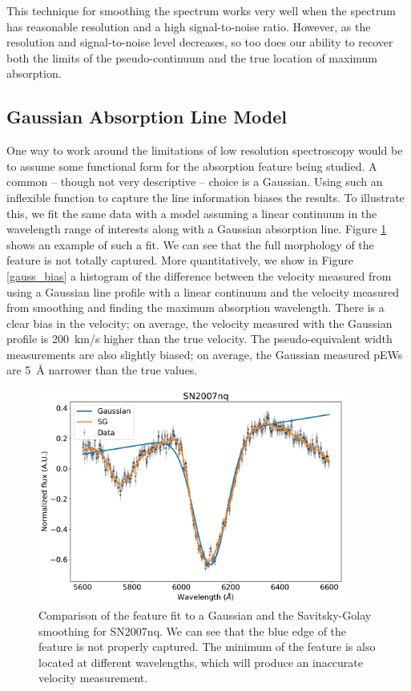 

This technique for smoothing the spectrum works very well when the spectrum has reasonable resolution and a high signal-to-noise ratio. However, as the resolution and signal-to-noise level decreases, so too does our ability to recover both the limits of the pseudo-continuum and the true location of maximum absorption. 

\subsection{Gaussian Absorption Line Model}
One way to work around the limitations of low resolution spectroscopy would be to assume some functional form for the absorption feature being studied. A common -- though not very descriptive -- choice is a Gaussian. Using such an inflexible function to capture the line information biases the results. To illustrate this, we fit the same data with a model assuming a linear continuum in the wavelength range of interests along with a Gaussian absorption line. Figure \ref{gauss_feat_fit} shows an example of such a fit. We can see that the full morphology of the feature is not totally captured. More quantitatively, we show in Figure \ref{gauss_bias} a histogram of the difference between the velocity measured from using a Gaussian line profile with a linear continuum and the velocity measured from smoothing and finding the maximum absorption wavelength. There is a clear bias in the velocity; on average, the velocity measured with the Gaussian profile is 200~km/s higher than the true velocity. The pseudo-equivalent width measurements are also slightly biased; on average, the Gaussian measured pEWs are 5~\AA{} narrower than the true values.

\begin{figure}
    \centering
    \includegraphics[width=0.9\textwidth]{figures/si_feat_pca/gauss_fit_example.pdf}
    \caption{Comparison of the \siliconii{} feature fit to a Gaussian and the Savitsky-Golay smoothing for SN2007nq. We can see that the blue edge of the feature is not properly captured. The minimum of the feature is also located at different wavelengths, which will produce an inaccurate velocity measurement.}
    \label{gauss_feat_fit}
\end{figure}


